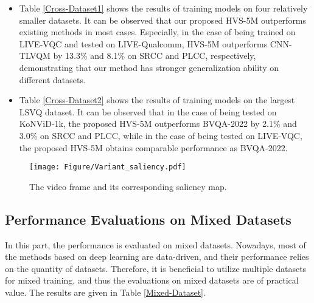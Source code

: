 \documentclass[journal]{IEEEtran}
\begin{document}
\begin{itemize}
\item Table \ref{Cross-Dataset1} shows the results of training models on four relatively smaller datasets. It can be observed that our proposed HVS-5M outperforms existing methods in most cases. Especially, in the case of being trained on LIVE-VQC and tested on LIVE-Qualcomm, HVS-5M outperforms CNN-TLVQM \cite{CNN-TLVQM} by 13.3\% and 8.1\% on SRCC and PLCC, respectively, demonstrating that our method has stronger generalization ability on different datasets.

\item Table \ref{Cross-Dataset2} shows the results of training models on the largest LSVQ dataset. It can be observed that in the case of being tested on KoNViD-1k, the proposed HVS-5M outperforms BVQA-2022 \cite{Li2022} by 2.1\% and 3.0\% on SRCC and PLCC, while in the case of being tested on LIVE-VQC, the proposed HVS-5M obtains comparable performance as BVQA-2022.

\end{itemize}



\begin{figure}[t]\centering

\setlength{\belowcaptionskip}{-0.18cm}
\centerline{\texttt{[image: Figure/Variant\_saliency.pdf]}}
\setlength{\abovecaptionskip}{-0.15cm}


\caption{The video frame and its corresponding saliency map.} \label{Variant saliency}
\end{figure}


 \subsection{Performance Evaluations on Mixed Datasets} \label{mixed datasets}
In this part, the performance is evaluated on mixed datasets. Nowadays, most of the methods based on deep learning are data-driven, and their performance relies on the quantity of datasets. Therefore, it is beneficial to utilize multiple datasets for mixed training, and thus the evaluations on mixed datasets are of practical value.
The results are given in Table \ref{Mixed-Dataset}.
\end{document}
